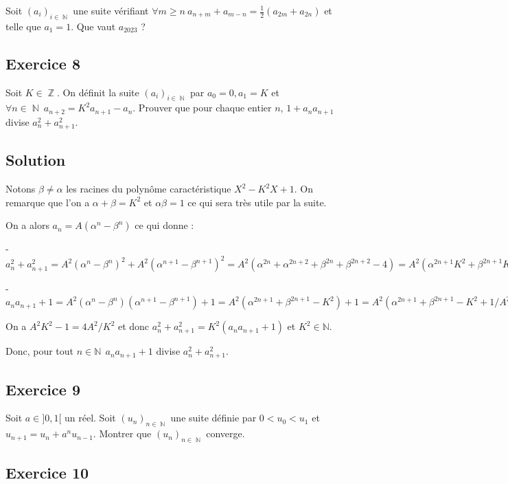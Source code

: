 \documentclass{article}
\DeclareMathOperator{\Z}{\mathbb{Z}}
\DeclareMathOperator{\N}{\mathbb{N}}
\begin{document}
Soit $(a_i)_{i\in \N}$ une suite vérifiant $\forall m \geqslant n \ a_{n+m} + a_{m-n} = \displaystyle\frac{1}{2}(a_{2m} + a_{2n})$ et telle que $a_1 = 1$. Que vaut $a_{2023}$ ? 

\subsection*{Exercice 8} 

Soit $K\in \Z$. On définit la suite $(a_i)_{i\in \N}$ par $a_0 = 0, a_1 = K$ et $\forall n\in \N \ a_{n+2} = K^2a_{n+1} - a_n$. Prouver que pour chaque entier $n$, $1 + a_na_{n+1}$ divise $a_n^2 + a_{n+1}^2$. 

\subsection*{Solution} 

Notons $\beta \neq \alpha $ les racines du polynôme caractéristique  $X^2 - K^2X + 1$. On remarque que l'on a $\alpha + \beta = K^2$ et $\alpha\beta = 1$ ce qui sera très utile par la suite. 

On a alors $a_n = A(\alpha^n - \beta^n)$ ce qui donne : 

- $a_n^2 + a_{n+1}^2 = A^2(\alpha^n - \beta^n)^2 + A^2(\alpha^{n+1} - \beta^{n+1})^2  = A^2(\alpha^{2n} + \alpha^{2n+2} + \beta^{2n} + \beta^{2n+2} - 4)
= A^2(\alpha^{2n+1}K^2 + \beta^{2n+1}K^2 - 4) = A^2K^2(\alpha^{2n+1} + \beta^{2n+1} - 4/K^2)  
= K^2(\alpha^{2n+1}A^2 + \beta^{2n+1}A^2 - 4A^2/K^2)$ 

- $a_na_{n+1} + 1 = A^2(\alpha^n - \beta^n)(\alpha^{n+1} - \beta^{n+1}) + 1 = A^2(\alpha^{2n+1} + \beta^{2n+1} - K^2) + 1 = A^2(\alpha^{2n+1} + \beta^{2n+1} - K^2 +1/A^2) 
=  (\alpha^{2n+1} + \beta^{2n+1} - A^2K^2 +1) $  

On a $A^2K^2 - 1 = 4A^2/K^2$ et donc $a_n^2 + a_{n+1}^2 = K^2(a_na_{n+1} + 1) $ et $K^2 \in \mathbb{N}$. 

Donc, pour tout $n\in \mathbb{N}  \ \ a_na_{n+1} + 1$ divise $a_n^2 + a_{n+1}^2$. 


\subsection*{Exercice 9} 

Soit $a \in ]0, 1[$ un réel. Soit $(u_n)_{n\in \N}$ une suite définie par $0 < u_0 < u_1$ et $u_{n+1} = u_n + a^nu_{n-1}$. Montrer que $(u_n)_{n\in \N}$ converge.  

\subsection*{Exercice 10} 
\end{document}

